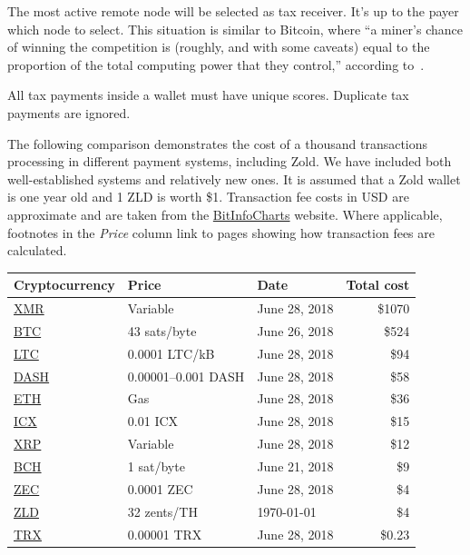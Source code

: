 \documentclass{main}
\begin{document}
The most active remote node will be selected as tax receiver.
It's up to the payer which node to select. This situation is similar
to Bitcoin, where ``a miner's chance of winning the
competition is (roughly, and with some caveats) equal to the proportion of the total computing
power that they control,'' according to~\textcite{foroglou2015}.

All tax payments inside a wallet must have unique scores.
Duplicate tax payments are ignored.

The following comparison demonstrates the cost of a thousand transactions
processing in different payment systems, including Zold. We have included both well-established systems and relatively new ones.
It is assumed that a Zold wallet is one year old
and 1 ZLD is worth \$1. Transaction fee costs in USD are approximate and are taken from the \href{https://bitinfocharts.com/}{BitInfoCharts} website. Where applicable, footnotes in the \textit{Price} column link to pages showing how transaction fees are calculated.

\begin{tabular}{lllr}
\hline
Cryptocurrency & Price & Date & Total cost \\
\hline
\href{https://getmonero.org/}{XMR} &
   Variable\footnotemark &
   June 28, 2018 &
   \$1070 \\
\href{https://bitcoin.org}{BTC} &
  43 sats/byte\footnotemark &
  June 26, 2018 &
  \$524 \\
\href{https://litecoin.org/}{LTC} &
  0.0001 LTC/kB\footnotemark &
  June 28, 2018 &
  \$94 \\
\href{https://www.dash.org/}{DASH} &
  0.00001--0.001 DASH\footnotemark &
  June 28, 2018 &
  \$58 \\
\href{https://www.ethereum.org/}{ETH} &
  Gas\footnotemark &
  June 28, 2018 &
  \$36 \\
\href{https://icon.foundation/}{ICX} &
  0.01 ICX\footnotemark &
  June 28, 2018 &
  \$15 \\
\href{https://ripple.com/xrp/}{XRP} &
   Variable\footnotemark &
   June 28, 2018 &
   \$12 \\
\href{https://www.bitcoincash.org/}{BCH} &
  1 sat/byte &
  June 21, 2018 &
  \$9 \\
\href{https://z.cash/}{ZEC} &
   0.0001 ZEC\footnotemark &
   June 28, 2018 &
   \$4 \\
\href{http://www.zold.io/}{ZLD} &
  32 zents/TH &
  \today &
  \$4 \\
\href{https://tron.network/}{TRX} &
  0.00001 TRX\footnotemark &
  June 28, 2018 &
  \$0.23 \\
\hline
\end{tabular}
\end{document}
